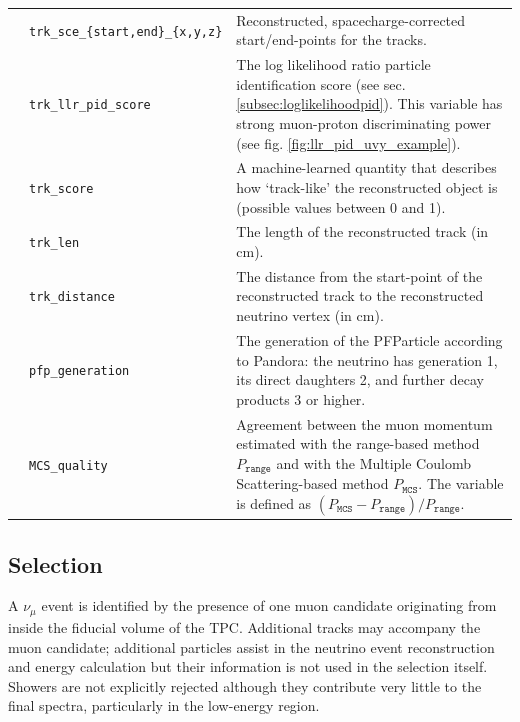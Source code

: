 \begin{table}[H]
\begin{tabular}{ m{} | m{} | m{}  }
\multicolumn{1}{l|}{} & \texttt{trk\_sce\_\{start,end\}\_\{x,y,z\}} &  Reconstructed, spacecharge-corrected start/end-points for the tracks.\\  \cline{2-3}
\multicolumn{1}{l|}{} & \texttt{trk\_llr\_pid\_score} &  The log likelihood ratio particle identification score (see sec. \ref{subsec:loglikelihoodpid}). This variable has strong muon-proton discriminating power (see fig. \ref{fig:llr_pid_uvy_example}).\\  \cline{2-3}
\multicolumn{1}{l|}{} & \texttt{trk\_score} & A machine-learned quantity that describes how `track-like' the reconstructed object is (possible values between 0 and 1). \\  \cline{2-3}
\parbox[t]{2mm}{} & \texttt{trk\_len} & The length of the reconstructed track (in cm). \\  
 & \texttt{trk\_distance} & The distance from the start-point of the reconstructed track to the reconstructed neutrino vertex (in cm). \\  
 & \texttt{pfp\_generation} &  The generation of the PFParticle according to Pandora: the neutrino has generation 1, its direct daughters 2, and further decay products 3 or higher.\\  
 & \texttt{MCS\_quality} &  Agreement between the muon momentum estimated with the range-based method $P_\texttt{range}$ and with the Multiple Coulomb Scattering-based method $P_\texttt{MCS}$. The variable is defined as $(P_\texttt{MCS}-P_\texttt{range})/P_\texttt{range}$.\\  
\hline

\end{tabular}
\label{tab:numuvariableSummary}
\end{table}

\subsection{Selection}
\label{sssec:NuMUCCsel:constr:selectionandsignal}

\par A $\nu_{\mu}$ event is identified by the presence of one muon candidate originating from inside the fiducial volume of the TPC. Additional tracks may accompany the muon candidate; additional particles assist in the neutrino event reconstruction and energy calculation but their information is not used in the selection itself. Showers are not explicitly rejected although they contribute very little to the final spectra, particularly in the low-energy region. 

